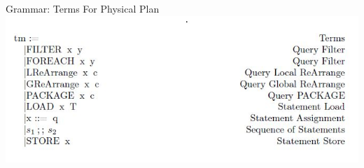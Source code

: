 \begin{frame}{Grammar: Terms For Physical Plan}
\centering
\includegraphics[scale=0.6]{Images/Grammar/Terms_Physical.JPG}
\end{frame}

